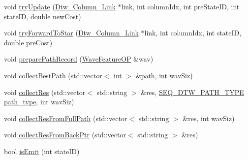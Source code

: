 \begin{DoxyCompactItemize}
\item 
void \hyperlink{class_seq_model_ac008d90549bd9f165a576c6f2dd21c6b}{try\+Update} (\hyperlink{struct_dtw___column___link}{Dtw\+\_\+\+Column\+\_\+\+Link} $\ast$link, int column\+Idx, int pre\+State\+I\+D, int state\+I\+D, double new\+Cost)
\item 
void \hyperlink{class_seq_model_a09ed709bb828242d2741f23dbf04a094}{try\+Forward\+To\+Star} (\hyperlink{struct_dtw___column___link}{Dtw\+\_\+\+Column\+\_\+\+Link} $\ast$link, int column\+Idx, int state\+I\+D, double pre\+Cost)
\item 
void \hyperlink{class_seq_model_a270c77892a0af88e65870411836460cc}{prepare\+Path\+Record} (\hyperlink{class_wave_feature_o_p}{Wave\+Feature\+O\+P} \&wav)
\item 
void \hyperlink{class_seq_model_a25c6599a2c7ee7119b4a207a3e7258c7}{collect\+Best\+Path} (std\+::vector$<$ int $>$ \&path, int wav\+Siz)
\item 
void \hyperlink{class_seq_model_af44a06f2393cb6b1d9ce4a86f11a1b2c}{collect\+Res} (std\+::vector$<$ std\+::string $>$ \&res, \hyperlink{class_seq_model_a145b769692f03811a15c5289fe77da42}{S\+E\+Q\+\_\+\+D\+T\+W\+\_\+\+P\+A\+T\+H\+\_\+\+T\+Y\+P\+E} \hyperlink{class_seq_model_afa1904812bb4a3363960db559983e195}{path\+\_\+type}, int wav\+Siz)
\item 
void \hyperlink{class_seq_model_a24708d1260c6571aa71d98c25cc82a8f}{collect\+Res\+From\+Full\+Path} (std\+::vector$<$ std\+::string $>$ \&res, int wav\+Siz)
\item 
void \hyperlink{class_seq_model_ae0936d327c05ac96766b36aa330eda51}{collect\+Res\+From\+Back\+Ptr} (std\+::vector$<$ std\+::string $>$ \&res)
\item 
bool \hyperlink{class_seq_model_a33c66284f1e2b002d640be91091ac352}{is\+Emit} (int state\+I\+D)
\end{DoxyCompactItemize}
